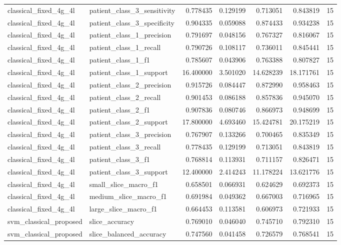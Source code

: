 \begin{tabular}{llrrrrr}
classical_fixed_4g_4l & patient_class_3_sensitivity & 0.778435 & 0.129199 & 0.713051 & 0.843819 & 15 \\
classical_fixed_4g_4l & patient_class_3_specificity & 0.904335 & 0.059088 & 0.874433 & 0.934238 & 15 \\
classical_fixed_4g_4l & patient_class_1_precision & 0.791697 & 0.048156 & 0.767327 & 0.816067 & 15 \\
classical_fixed_4g_4l & patient_class_1_recall & 0.790726 & 0.108117 & 0.736011 & 0.845441 & 15 \\
classical_fixed_4g_4l & patient_class_1_f1 & 0.785607 & 0.043906 & 0.763388 & 0.807827 & 15 \\
classical_fixed_4g_4l & patient_class_1_support & 16.400000 & 3.501020 & 14.628239 & 18.171761 & 15 \\
classical_fixed_4g_4l & patient_class_2_precision & 0.915726 & 0.084447 & 0.872990 & 0.958463 & 15 \\
classical_fixed_4g_4l & patient_class_2_recall & 0.901453 & 0.086188 & 0.857836 & 0.945070 & 15 \\
classical_fixed_4g_4l & patient_class_2_f1 & 0.907836 & 0.080746 & 0.866973 & 0.948699 & 15 \\
classical_fixed_4g_4l & patient_class_2_support & 17.800000 & 4.693460 & 15.424781 & 20.175219 & 15 \\
classical_fixed_4g_4l & patient_class_3_precision & 0.767907 & 0.133266 & 0.700465 & 0.835349 & 15 \\
classical_fixed_4g_4l & patient_class_3_recall & 0.778435 & 0.129199 & 0.713051 & 0.843819 & 15 \\
classical_fixed_4g_4l & patient_class_3_f1 & 0.768814 & 0.113931 & 0.711157 & 0.826471 & 15 \\
classical_fixed_4g_4l & patient_class_3_support & 12.400000 & 2.414243 & 11.178224 & 13.621776 & 15 \\
classical_fixed_4g_4l & small_slice_macro_f1 & 0.658501 & 0.066931 & 0.624629 & 0.692373 & 15 \\
classical_fixed_4g_4l & medium_slice_macro_f1 & 0.691984 & 0.049362 & 0.667003 & 0.716965 & 15 \\
classical_fixed_4g_4l & large_slice_macro_f1 & 0.664453 & 0.113581 & 0.606973 & 0.721933 & 15 \\
svm_classical_proposed & slice_accuracy & 0.769010 & 0.046040 & 0.745710 & 0.792310 & 15 \\
svm_classical_proposed & slice_balanced_accuracy & 0.747560 & 0.041458 & 0.726579 & 0.768541 & 15 \\

\end{tabular}
